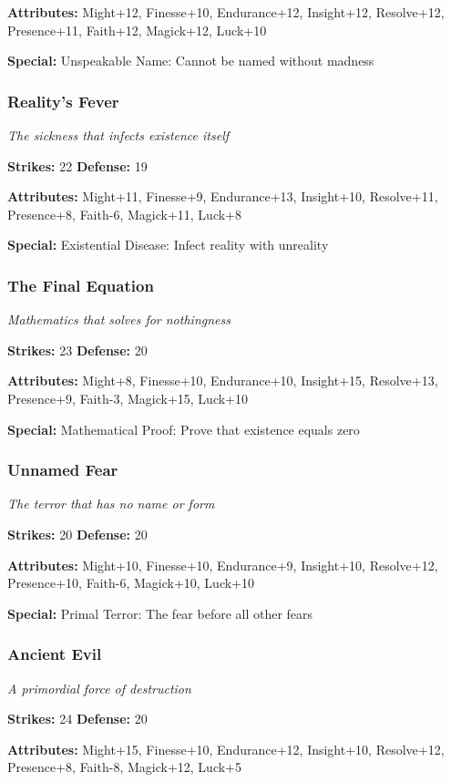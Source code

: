 \documentclass[10pt,twoside]{article}
\begin{document}
\textbf{Attributes:} Might+12, Finesse+10, Endurance+12, Insight+12, Resolve+12, Presence+11, Faith+12, Magick+12, Luck+10

\textbf{Special:} Unspeakable Name: Cannot be named without madness

\subsubsection{Reality's Fever}
\textit{The sickness that infects existence itself}

\textbf{Strikes:} 22 \quad \textbf{Defense:} 19

\textbf{Attributes:} Might+11, Finesse+9, Endurance+13, Insight+10, Resolve+11, Presence+8, Faith-6, Magick+11, Luck+8

\textbf{Special:} Existential Disease: Infect reality with unreality

\subsubsection{The Final Equation}
\textit{Mathematics that solves for nothingness}

\textbf{Strikes:} 23 \quad \textbf{Defense:} 20

\textbf{Attributes:} Might+8, Finesse+10, Endurance+10, Insight+15, Resolve+13, Presence+9, Faith-3, Magick+15, Luck+10

\textbf{Special:} Mathematical Proof: Prove that existence equals zero

\subsubsection{Unnamed Fear}
\textit{The terror that has no name or form}

\textbf{Strikes:} 20 \quad \textbf{Defense:} 20

\textbf{Attributes:} Might+10, Finesse+10, Endurance+9, Insight+10, Resolve+12, Presence+10, Faith-6, Magick+10, Luck+10

\textbf{Special:} Primal Terror: The fear before all other fears

\subsubsection{Ancient Evil}
\textit{A primordial force of destruction}

\textbf{Strikes:} 24 \quad \textbf{Defense:} 20

\textbf{Attributes:} Might+15, Finesse+10, Endurance+12, Insight+10, Resolve+12, Presence+8, Faith-8, Magick+12, Luck+5
\end{document}
